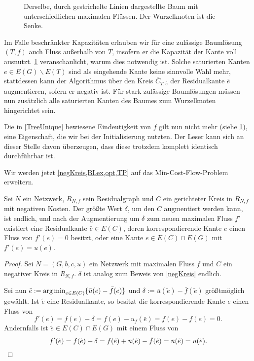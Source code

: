 \begin{figure}[!ht]\centering
		
	\caption{Derselbe, durch gestrichelte Linien dargestellte Baum mit unterschiedlichen maximalen Flüssen. Der Wurzelknoten ist die Senke.}
	\label{fig:NSA}
\end{figure}

Im Falle beschränkter Kapazitäten erlauben wir für eine zulässige Baumlösung $(T,f)$ auch Fluss außerhalb von $T$, insofern er die Kapazität der Kante voll ausnutzt. \cref{fig:NSA} veranschaulicht, warum dies notwendig ist. Solche saturierten Kanten $e\in E(G)\backslash E(T)$ sind als eingehende Kante keine sinnvolle Wahl mehr, stattdessen kann der Algorithmus über den Kreis $\bar{C}_{T,\bar{e}}$ der Residualkante $\bar{e}$ augmentieren, sofern er negativ ist. Für stark zulässige Baumlösungen müssen nun zusätzlich alle saturierten Kanten des Baumes zum Wurzelknoten hingerichtet sein.

Die in \cref{TreeUnique} bewiesene Eindeutigkeit von $f$ gilt nun nicht mehr (siehe \cref{fig:NSA}), eine Eigenschaft, die wir bei der Initialisierung nutzten. Der Leser kann sich an dieser Stelle davon überzeugen, dass diese trotzdem komplett identisch durchführbar ist.

Wir werden jetzt \cref{negKreis,BLex,opt,TP} auf das Min-Cost-Flow-Problem erweitern.

\begin{lem}\label{negKreis2}Sei $N$ ein Netzwerk, $R_{N,f}$ sein Residualgraph und $C$ ein gerichteter Kreis in $R_{N,f}$ mit negativen Kosten. Der größte Wert $\delta$, um den $C$ augmentiert werden kann, ist endlich, und nach der Augmentierung um $\delta$ zum neuen maximalen Fluss $f'$ existiert eine Residualkante $\bar{e}\in E(C)$, deren korrespondierende Kante $e$ einen Fluss von $f'(e)=0$ besitzt, oder eine Kante $e\in E(C)\cap E(G)$ mit $f'(e)=u(e)$.\end{lem}
\begin{proof}Sei $N=(G,b,c,u)$ ein Netzwerk mit maximalen Fluss $f$ und $C$ ein negativer Kreis in $R_{N,f}$. $\delta$ ist analog zum Beweis von \cref{negKreis} endlich.
	
Sei nun $\tilde{e}:=\operatorname*{arg\,min}_{e\in E(C)}\{\bar{u}(e)-\bar{f}(e)\}$ und $\delta:=\bar{u}(\tilde{e})-\bar{f}(\tilde{e})$ größtmöglich gewählt. Ist $\tilde{e}$ eine Residualkante, so besitzt die korrespondierende Kante $e$ einen Fluss von
\begin{equation*}
f'(e)=f(e)-\delta=f(e)-u_f(\bar{e})=f(e)-f(e)=0.\end{equation*} Andernfalls ist $\tilde{e}\in E(C)\cap E(G)$ mit einem Fluss von
\begin{equation*}
f'(\tilde{e})=f(\tilde{e})+\delta=f(\tilde{e})+\bar{u}(\tilde{e})-\bar{f}(\tilde{e})=\bar{u}(\tilde{e})=u(\tilde{e}).\qedhere\end{equation*}\end{proof}

